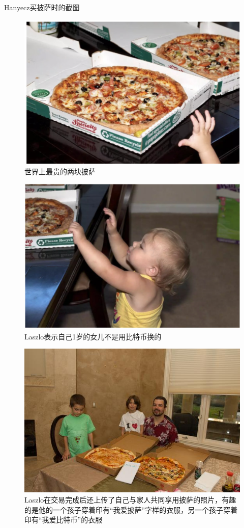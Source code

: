 \documentclass[11pt]{beamer}
\begin{document}
\begin{frame}[allowframebreaks]{Hanyecz买披萨时的截图}
	\begin{figure}
		\centering
		\includegraphics[width=0.7\linewidth]{figures/pizza01}
		\caption{世界上最贵的两块披萨}
	\end{figure}

	\begin{figure}
		\centering
		\includegraphics[width=0.7\linewidth]{figures/pizza02}
		\caption{Laszlo表示自己1岁的女儿不是用比特币换的}
	\end{figure}

	\begin{figure}
		\centering
		\includegraphics[width=0.6\linewidth]{figures/pizzabybtc}
		\caption{Laszlo在交易完成后还上传了自己与家人共同享用披萨的照片，有趣的是他的一个孩子穿着印有“我爱披萨”字样的衣服，另一个孩子穿着印有“我爱比特币”的衣服}
		\label{fig:pizzabybtc}
	\end{figure}

\end{frame}
\end{document}
